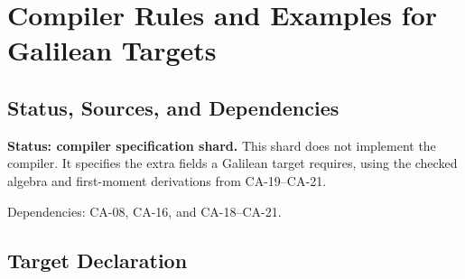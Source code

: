 
\section{Compiler Rules and Examples for Galilean Targets}
\label{sec:galilean-compiler-interface}

\subsection{Status, Sources, and Dependencies}

\textbf{Status: compiler specification shard.}  This shard does not implement
the compiler.  It specifies the extra fields a Galilean target requires, using
the checked algebra and first-moment derivations from CA-19--CA-21.

Dependencies: CA-08, CA-16, and CA-18--CA-21.


\subsection{Target Declaration}

